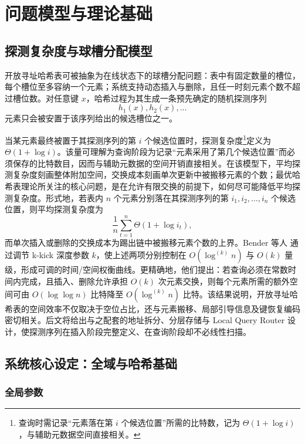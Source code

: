 \chapter{问题模型与理论基础}
\label{ch:theo_base}

\section{探测复杂度与球槽分配模型}

开放寻址哈希表可被抽象为在线状态下的球槽分配问题\cite{aamand2021dynamic,bansal2022deletions,mitzenmacher2001}：表中有固定数量的槽位，每个槽位至多容纳一个元素；系统支持动态插入与删除，且任一时刻元素个数不超过槽位数。对任意键 \(x\)，哈希过程为其生成一条预先确定的随机探测序列
\[
  h_1(x), h_2(x), \ldots
\]
元素只会被安置于该序列给出的候选槽位之一。

当某元素最终被置于其探测序列的第 \(i\) 个候选位置时，探测复杂度\footnote{查询时需记录“元素落在第 \(i\) 个候选位置”所需的比特数，记为 \(\Theta(1+\log i)\)，与辅助元数据空间直接相关。}定义为 \(\Theta(1+\log i)\)。该量可理解为查询阶段为记录“元素采用了第几个候选位置”而必须保存的比特数目，因而与辅助元数据的空间开销直接相关。在该模型下，平均探测复杂度刻画整体附加空间，交换成本刻画单次更新中被搬移元素的个数；最优哈希表理论所关注的核心问题，是在允许有限交换的前提下，如何尽可能降低平均探测复杂度\cite{bender2022otsh,kuszmaul2024filters,pagh2004linear}。形式地，若表内 \(n\) 个元素分别落在其探测序列的第 \(i_1,i_2,\ldots,i_n\) 个候选位置，则平均探测复杂度为
\[
  \frac{1}{n}\sum_{t=1}^{n}\Theta(1+\log i_t),
\]
而单次插入或删除的交换成本为踢出链中被搬移元素个数的上界。Bender 等人\cite{bender2022otsh} 通过调节 k-kick 深度参数 \(k\)，使上述两项分别控制在 \(O(\log^{(k)}n)\) 与 \(O(k)\) 量级，形成可调的时间/空间权衡曲线。更精确地，他们提出：若查询必须在常数时间内完成，且插入、删除允许承担 \(O(k)\) 次元素交换，则每个元素所需的额外空间可由 \(O(\log\log n)\) 比特降至 \(O(\log^{(k)}n)\) 比特。该结果说明，开放寻址哈希表的空间效率不仅取决于空位占比，还与元素搬移、局部引导信息及键恢复编码密切相关。后文将给出与之配套的地址拆分、分层存储与 Local Query Router 设计，使探测序列在插入阶段完整定义、在查询阶段却不必线性扫描。

\section{系统核心设定：全域与哈希基础}

\subsection{全局参数}

